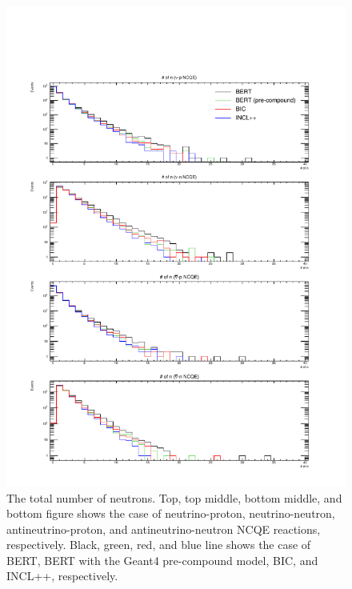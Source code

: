 \begin{figure}[h]
	\centering
	\includegraphics[width=16cm]{PDF/Secondary/Comparison_PreCompound/neutron/pdf1/Logy_Num}
	\caption[The total number of neutrons]{
	The total number of neutrons.
	Top, top middle, bottom middle, and bottom figure shows the case of neutrino-proton, neutrino-neutron, antineutrino-proton, and antineutrino-neutron NCQE reactions, respectively.
	Black, green, red, and blue line shows the case of BERT, BERT with the Geant4 pre-compound model, BIC, and INCL++, respectively.
	}\label{Others_neutron_Logy_Num}
\end{figure}

